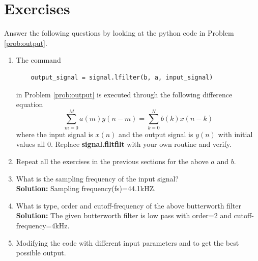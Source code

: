 \documentclass[journal,12pt,twocolumn]{IEEEtran}
\newcommand{\solution}{\noindent \textbf{Solution: }}
\providecommand{\brak}[1]{\ensuremath{\left(#1\right)}}
\numberwithin{equation}{section}
\renewcommand\thesection{\arabic{section}}
\begin{document}
\section{Exercises}
Answer the following questions by looking at the python code in Problem \ref{prob:output}.
\begin{enumerate}[label=\thesection.\arabic*]
\item
The command
\begin{lstlisting}
	output_signal = signal.lfilter(b, a, input_signal)
	\end{lstlisting}
in Problem \ref{prob:output} is executed through the following difference equation
\begin{equation}
\label{eq:iir_filter_gen}
 \sum _{m=0}^{M}a\brak{m}y\brak{n-m}=\sum _{k=0}^{N}b\brak{k}x\brak{n-k}
\end{equation}
%
where the input signal is $x(n)$ and the output signal is $y(n)$ with initial values all 0. Replace
\textbf{signal.filtfilt} with your own routine and verify.
%
\item Repeat all the exercises in the previous sections for the above $a$ and $b$.
\item What is the sampling frequency of the input signal?
\\
\solution
Sampling frequency(fs)=44.1kHZ.
\item
What is type, order and  cutoff-frequency of the above butterworth filter
\\
\solution
The given butterworth filter is low pass with order=2 and cutoff-frequency=4kHz.
%
\item
Modifying the code with different input parameters and to get the best possible output.
%
\end{enumerate}
\end{document}
